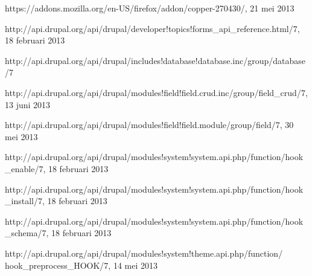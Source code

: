 \begin{thebibliography}{99}

 
 



 https://addons.mozilla.org/en-US/firefox/addon/copper-270430/, 21 mei 2013

 http://api.drupal.org/api/drupal/developer!topics!forms\_api\_reference.html/7, 18 februari 2013

 http://api.drupal.org/api/drupal/includes!database!database.inc/group/database/7

 http://api.drupal.org/api/drupal/modules!field!field.crud.inc/group/field\_crud/7, 13 juni 2013

 http://api.drupal.org/api/drupal/modules!field!field.module/group/field/7, 30 mei 2013

 http://api.drupal.org/api/drupal/modules!system!system.api.php/function/hook\_enable/7, 18 februari 2013

 http://api.drupal.org/api/drupal/modules!system!system.api.php/function/hook\_install/7, 18 februari 2013

 http://api.drupal.org/api/drupal/modules!system!system.api.php/function/hook\_schema/7, 18 februari 2013

 http://api.drupal.org/api/drupal/modules!system!theme.api.php/function/ hook\_preprocess\_HOOK/7, 14 mei 2013


\end{thebibliography}
